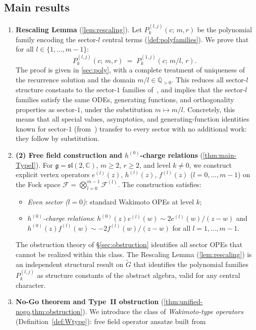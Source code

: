 \documentclass[12pt]{article}
\theoremstyle{plain}
\theoremstyle{definition}
\theoremstyle{remark}
\newcommand{\C}{\mathbb{C}}
\newcommand{\Q}{\mathbb{Q}}
\newcommand{\g}{\mathfrak{g}}
\newcommand{\sltwo}{\mathfrak{sl}(2,\C)}
\newcommand{\gtil}{\widetilde{G}}
\newcommand{\Plk}[2]{P^{(#1)}_{#2}}
\newcommand{\el}[1]{e^{(#1)}}
\newcommand{\hl}[1]{h^{(#1)}}
\newcommand{\fl}[1]{f^{(#1)}}
\newcommand{\Fl}[1]{\mathcal{F}^{(#1)}}
\newcommand{\OPE}{\sim}
\begin{document}
\subsection{Main results}
\begin{enumerate}
    \item \textbf{Rescaling Lemma} (\cref{lem:rescaling}).
Let $\Plk{l,j}{k}(c;\,m,r)$ be the polynomial family encoding the sector-$l$
central terms (\cref{def:polyfamilies}).
We prove that for all $l\in\{1,\ldots,m-1\}$:
\[
  \Plk{l,j}{k}(c;\,m,r) \;=\; \Plk{1,j}{k}(c;\,m/l,\,r).
\]
The proof is given in \cref{sec:poly}, with a complete treatment of
uniqueness of the recurrence solution and the domain $m/l\in\Q_{>0}$.
This reduces all sector-$l$ structure constants to the sector-$1$ families
of~\cite{SNF-I}, and implies that the sector-$l$ families satisfy
the same ODEs, generating functions, and orthogonality properties as
sector-$1$, under the substitution $m\mapsto m/l$.
Concretely, this means that all special values, asymptotics, and
generating-function identities known for sector-$1$ (from~\cite{SNF-I,CoxFutorny-JDE})
transfer to every sector with no additional work: they follow by substitution.
\item \textbf{(2) Free field construction and $h^{(0)}$-charge relations}
(\cref{thm:main-TypeI}).
For $\g=\sltwo$, $m\geq 2$, $r\geq 2$, and level $k\neq 0$, we construct
explicit vertex operators $\el{l}(z)$, $\hl{l}(z)$, $\fl{l}(z)$ ($l=0,\ldots,m-1$)
on the Fock space $\mathcal{F}=\bigotimes_{l=0}^{m-1}\Fl{l}$.
The construction satisfies:
\begin{itemize}[nosep]
  \item \emph{Even sector ($l=0$)}: standard Wakimoto OPEs at level $k$;
  \item \emph{$h^{(0)}$-charge relations}: $h^{(0)}(z)e^{(l)}(w)\OPE 2e^{(l)}(w)/(z-w)$
    and $h^{(0)}(z)f^{(l)}(w)\OPE -2f^{(l)}(w)/(z-w)$ for all $l=1,\ldots,m-1$.
\end{itemize}
The obstruction theory of \S\ref{sec:obstruction} identifies all sector OPEs
that cannot be realized within this class.
The Rescaling Lemma (\cref{lem:rescaling}) is an independent structural result
on $\gtil$ that identifies the polynomial families $\Plk{l,j}{k}$ as structure
constants of the abstract algebra, valid for any central character.
\item \textbf{No-Go theorem and Type~II obstruction}
(\cref{thm:unified-nogo,thm:obstruction}).
We introduce the class of \emph{Wakimoto-type operators}
(Definition~\ref{def:Wtype}): free field operator ansatze built from

\end{enumerate}
\end{document}
